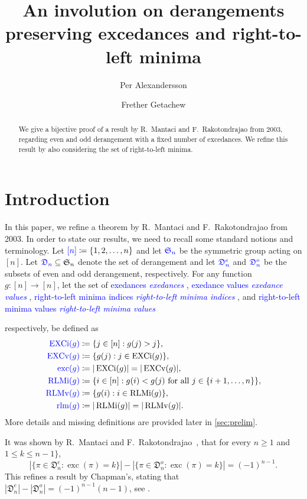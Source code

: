 \documentclass[reqno]{amsart}
\title{An involution on derangements preserving excedances and right-to-left minima}
\author[Per Alexandersson]{Per Alexandersson}
\author[Frether Getachew]{Frether Getachew}
\theoremstyle{definition}
\newcommand{\defin}[1]{%
\relax\ifmmode%
\textcolor{blue}{#1}%
\else\textcolor{blue}{\emph{#1}}%
\fi%
}
\newcommand{\symS}{\mathfrak{S}}
\newcommand{\dArr}{\mathfrak{D}}
\DeclareMathOperator{\exc}{exc}
\DeclareMathOperator{\EXCi}{EXCi}
\DeclareMathOperator{\EXCv}{EXCv}
\DeclareMathOperator{\rlm}{rlm}
\DeclareMathOperator{\RLMv}{RLMv}
\DeclareMathOperator{\RLMi}{RLMi}
\begin{document}

\begin{abstract}
 We give a bijective proof of a result by R.~Mantaci and F.~Rakotondrajao from 2003,
 regarding even and odd derangement with a fixed number of excedances.
 We refine this result by also considering the set of right-to-left minima.
\end{abstract}

\maketitle 

\section{Introduction}

In this paper, we refine a theorem by R.~Mantaci and F.~Rakotondrajao from 2003. 
In order to state our results, we need to recall some standard notions and terminology.
%
Let $\defin{[n]} \coloneqq \{1,2,\dotsc,n\}$ and let $\defin{\symS_n}$
be the symmetric group acting on $[n]$.
Let $\defin{\dArr_n} \subseteq \symS_n$ denote the set of derangement
and let $\defin{\dArr^e_n}$ and $\defin{\dArr^o_n}$ be the subsets
of even and odd derangement, respectively.
%
For any function $g:[n]\longrightarrow [n]$, let 
the set of \defin{exedances}, \defin{exedance values},
\defin{right-to-left minima indices}, and \defin{right-to-left minima values}
respectively, be defined as 
\begin{align*}
\defin{\EXCi(g)} &\coloneqq \{ j \in [n] : g(j)>j \}, \\
\defin{\EXCv(g)} &\coloneqq \{ g(j) : j \in \EXCi(g) \}, \\
\defin{\exc(g)} &\coloneqq |\EXCi(g)| = |\EXCv(g)|, \\
\defin{\RLMi(g)} &\coloneqq  \{i\in [n]: g(i)<g(j) \text{ for all } j\in \{i+1,\dotsc,n\} \},\\
\defin{\RLMv(g)}  &\coloneqq  \{ g(i) : i \in \RLMi(g)\}, \\
\defin{\rlm(g)} &\coloneqq |\RLMi(g)| = |\RLMv(g)| .
\end{align*}
More details and missing definitions are provided later in \cref{sec:prelim}.

It was shown by R.~Mantaci and F.~Rakotondrajao~\cite[Cor. 5.11]{MantaciRakotondrajao2003},
that for every $n\geq 1$ and $1 \leq k \leq n-1\}$,
\begin{equation}\label{eq:mainEquation}
 |\{ \pi \in \dArr^e_n  : \exc(\pi) = k \}|
 -
 |\{ \pi \in \dArr^o_n  : \exc(\pi)=k \}|
 =(-1)^{n-1}.
\end{equation}
This refines a result by Chapman's, stating that
$|\dArr^e_n|-|\dArr^o_n|=(-1)^{n-1}(n-1)$, see \cite{Chapman2001}.
\end{document}
